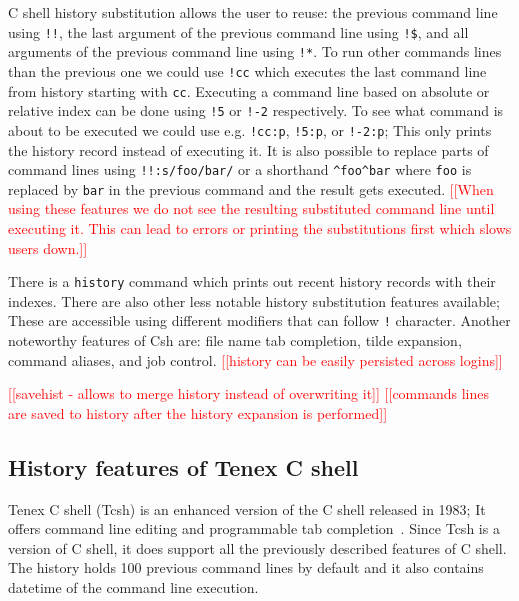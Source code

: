 \documentclass[thesis=M,english]{FITthesis}[2012/10/20]
\newcommand{\redtext}[1]{\textcolor{red}{[[#1]]}}
\let\myCite\cite
\renewcommand\cite{\unskip~\myCite}
\begin{document}

C shell history substitution allows the user to reuse: the previous command line using \verb|!!|, the last argument of the previous command line using \verb|!$|, and all arguments of the previous command line using \verb|!*|. To run other commands lines than the previous one we could use \verb|!cc| which executes the last command line from history starting with \verb|cc|. Executing a command line based on absolute or relative index can be done using \verb|!5| or \verb|!-2| respectively. To see what command is about to be executed we could use e.g. \verb|!cc:p|, \verb|!5:p|, or \verb|!-2:p|; This only prints the history record instead of executing it. It is also possible to replace parts of command lines using \verb|!!:s/foo/bar/| or a shorthand \verb|^foo^bar| where \verb|foo| is replaced by \verb|bar| in the previous command and the result gets executed. \redtext{When using these features we do not see the resulting substituted command line until executing it. This can lead to errors or printing the substitutions first which slows users down.}
    
There is a \verb|history| command which prints out recent history records with their indexes. There are also other less notable history substitution features available; These are accessible using different modifiers that can follow \verb|!| character. Another noteworthy features of Csh are: file name tab completion, tilde expansion, command aliases, and job control. \redtext{history can be easily persisted across logins}

\redtext{savehist - allows to merge history instead of overwriting it}
\redtext{commands lines are saved to history after the history expansion is performed}


\subsection{History features of Tenex C shell}
Tenex C shell (Tcsh) is an enhanced version of the C shell released in 1983; It offers command line editing and programmable tab completion\cite{dubois1995tcshusing}. Since Tcsh is a version of C shell, it does support all the previously described features of C shell. The history holds 100 previous command lines by default and it also contains datetime of the command line execution.
\end{document}
